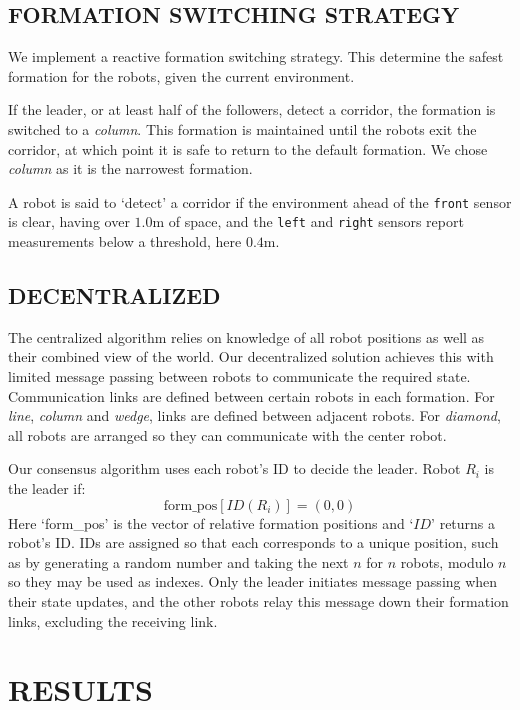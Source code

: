 \documentclass[letterpaper, 10 pt, conference]{ieeeconf}  %
\begin{document}
\subsection{FORMATION SWITCHING STRATEGY}

We implement a reactive formation switching strategy. This determine the safest formation for the robots, given the current environment.

If the leader, or at least half of the followers, detect a corridor, the formation is switched to a \textit{column}. This formation is maintained until the robots exit the corridor, at which point it is safe to return to the default formation. We chose \textit{column} as it is the narrowest formation.

A robot is said to `detect' a corridor if the environment ahead of the \texttt{front} sensor is clear, having over $1.0$m of space, and the \texttt{left} and \texttt{right} sensors report measurements below a threshold, here $0.4$m.

\subsection{DECENTRALIZED}

The centralized algorithm relies on knowledge of all robot positions as well as their combined view of the world. Our decentralized solution achieves this with limited message passing between robots to communicate the required state. Communication links are defined between certain robots in each formation. For \textit{line}, \textit{column} and \textit{wedge}, links are defined between adjacent robots. For \textit{diamond}, all robots are arranged so they can communicate with the center robot.

Our consensus algorithm uses each robot's ID to decide the leader. Robot $R_i$ is the leader if:
\[\text{form\_pos}[ID(R_i)] = (0,0)\]
Here `form\_pos' is the vector of relative formation positions and `$ID$' returns a robot's ID. IDs are assigned so that each corresponds to a unique position, such as by generating a random number and taking the next $n$ for $n$ robots, modulo $n$ so they may be used as indexes. Only the leader initiates message passing when their state updates, and the other robots relay this message down their formation links, excluding the receiving link.

\section{RESULTS}
\end{document}

